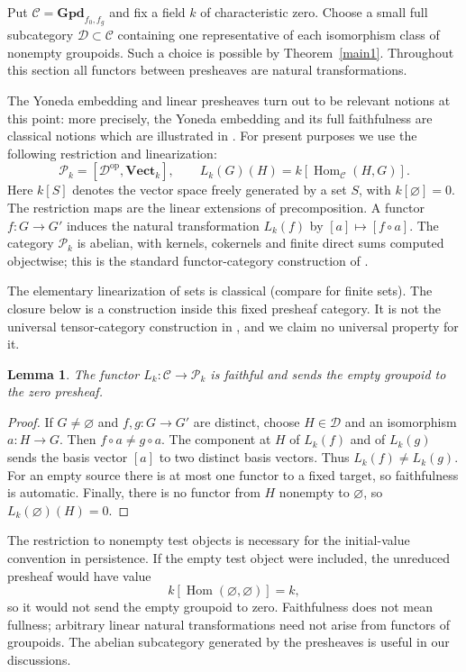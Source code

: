 \documentclass{amsart}
\newtheorem{lemma}[theorem]{Lemma}
\begin{document}
Put $\mathcal C=\mathbf{Gpd}_{f_0,f_g}$ and fix a field $k$ of characteristic zero. Choose a small full subcategory $\mathcal D\subset\mathcal C$ containing one representative of each isomorphism class of nonempty groupoids. Such a choice is possible by Theorem~\ref{main1}. Throughout this section all functors between presheaves are natural transformations.

The Yoneda embedding and linear presheaves turn out to be relevant notions at this point: more precisely, the Yoneda embedding and its full faithfulness are classical notions which are illustrated in \cite[Section~III.2, pp.~61--62]{maclane1998categories}. For present purposes we use the following restriction and linearization:
\[
\mathcal P_k=[\mathcal D^{\mathrm{op}},\mathbf{Vect}_k],
\qquad
L_k(G)(H)=k[\operatorname{Hom}_{\mathcal C}(H,G)].
\]
Here $k[S]$ denotes the vector space freely generated by a set $S$, with $k[\varnothing]=0$. The restriction maps are the linear extensions of precomposition. A functor $f:G\to G'$ induces the natural transformation $L_k(f)$ by $[a]\mapsto[f\circ a]$. The category $\mathcal P_k$ is abelian, with kernels, cokernels and finite direct sums computed objectwise; this is the standard functor-category construction of \cite[Section~VIII.3, p.~199]{maclane1998categories}.

The elementary linearization of sets is classical (compare \cite[Sections~1.1--1.3]{deligne2004categorie} for finite sets). The closure below is a construction inside this fixed presheaf category. It is not the universal tensor-category construction in  \cite[Section 8]{deligne2004categorie}, and we claim no universal property for it.

\begin{lemma}\label{lem:normalized-faithful}
The functor $L_k:\mathcal C\to\mathcal P_k$ is faithful and sends the empty groupoid to the zero presheaf.
\end{lemma}
\begin{proof}
If $G\neq\varnothing$ and $f,g:G\to G'$ are distinct, choose $H\in\mathcal D$ and an isomorphism $a:H\to G$. Then $f\circ a\neq g\circ a$. The component at $H$ of $L_k(f)$ and of $L_k(g)$ sends the basis vector $[a]$ to two distinct basis vectors. Thus $L_k(f)\neq L_k(g)$. For an empty source there is at most one functor to a fixed target, so faithfulness is automatic. Finally, there is no functor from $H$ nonempty  to $\varnothing$,  so $L_k(\varnothing)(H)=0$.
\end{proof}

The restriction to nonempty test objects is necessary for the initial-value convention in persistence. If the empty test object were included, the unreduced presheaf would have value
\[
k[\operatorname{Hom}(\varnothing,\varnothing)]=k,
\]
so it would not send the empty groupoid to zero. Faithfulness does not mean fullness; arbitrary linear natural transformations need not arise from functors of groupoids. The abelian subcategory generated by the presheaves is useful in our discussions.
\end{document}
